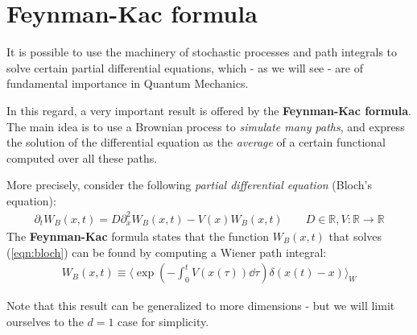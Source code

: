 \documentclass[../template.tex]{subfiles}
\begin{document}
\section{Feynman-Kac formula}
It is possible to use the machinery of stochastic processes and path integrals to solve certain partial differential equations, which - as we will see - are of fundamental importance in Quantum Mechanics.

In this regard, a very important result is offered by the \textbf{Feynman-Kac formula}. The main idea is to use a Brownian process to \textit{simulate many paths}, and express the solution of the differential equation as the \textit{average} of a certain functional computed over all these paths. 

More precisely, consider the following \textit{partial differential equation} (Bloch's equation): 
\begin{align}
    \partial_t W_B(x,t) = D \partial_x^2 W_B(x,t) - V(x) W_B(x,t) \qquad D \in \mathbb{R}, V\colon \mathbb{R} \to \mathbb{R}  
    \label{eqn:bloch}
\end{align}
The \textbf{Feynman-Kac} formula states that the function $W_B(x,t)$ that solves (\ref{eqn:bloch}) can be found by computing a Wiener path integral: 
\begin{align}
    W_B(x,t) \equiv \langle \exp\left(-\int_0^t V(x(\tau)) \dd{\tau}\right) \delta(x(t) - x) \rangle_W
    \label{eqn:Wb}
\end{align}

\begin{comment}
(the $4D$ constant has been absorbed by $V$). Then the following holds:
Recall the Schr\"odinger equation:
\begin{align*}
    i\hbar \partial_t \psi(x,t) = -\frac{\hbar^2}{2m} \partial_x^2 \psi(x,t) + v(x) \psi(x,t) 
\end{align*}
So by mapping $t \to -it$ (passing to \q{imaginary time}), and $\psi(-it, x) \equiv \hat{\psi}(t,x)$  we can cancel the $i$ the Schr\"odinger equation, leading to:
\begin{align*}
    \hbar \pdv{t} \hat{\psi} = \underbrace{\frac{\hbar^2}{2 m}}_{D} \partial_x^2 \hat{\psi} - \underbrace{\frac{v(x)}{\hbar}}_{V}  \hat{\psi}  
\end{align*}
which is equivalent to the Bloch equation.
\end{comment}

Note that this result can be generalized to more dimensions - but we will limit ourselves to the $d=1$ case for simplicity.
\end{document}
